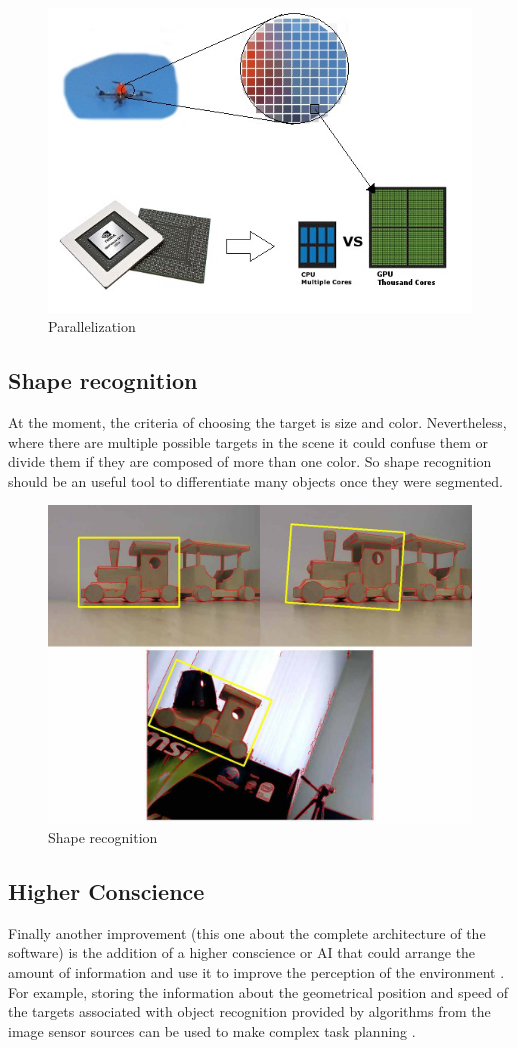 	\begin{figure}[ph]
		\centering
		\includegraphics[width=0.7\linewidth]{../Images/c5/gpu}
		\caption{Parallelization}
		\label{fig:gpu}
	\end{figure}


	\subsection{Shape recognition}
	At the moment, the criteria of choosing the target is size and color. Nevertheless, where there are multiple possible targets in the scene it could confuse them or divide them if they are composed of more than one color. So shape recognition \cite{color_shape_object_recogn} \cite{Fast_object_recogn_shape} should be an useful tool to differentiate many objects once they were segmented.
	
	\begin{figure}[th]
		\centering
		\includegraphics[width=0.6\linewidth]{../Images/c6/shape_recogn}
		\caption{Shape recognition}
		\label{fig:shape_recogn}
	\end{figure}
		
	\subsection{Higher Conscience}
	Finally another improvement (this one about the complete architecture of the software) is the addition of a higher conscience or AI that could arrange the amount of information and use it to improve the perception of the environment \cite{Multirate_sampled_uav} \cite{multi_uav_path_planning}.
	For example, storing the information about the geometrical position and speed of the targets associated with object recognition provided by algorithms from the image sensor sources can be used to make complex task planning \cite{task_allocation}.
	
